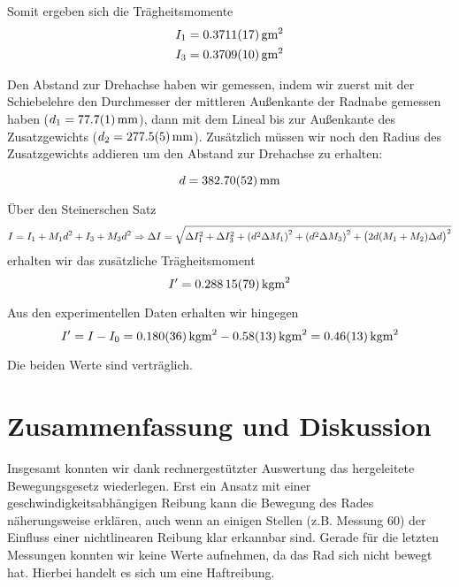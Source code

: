 \documentclass[a4paper,german,12pt,smallheadings]{scrartcl}
\begin{document}
Somit ergeben sich die Trägheitsmomente
\begin{align*}
  I_1 &= \SI{0.3711+-0.0017}{g m^2} \\
  I_3 &= \SI{0.3709+-0.0010}{g m^2}
\end{align*}

Den Abstand zur Drehachse haben wir gemessen, indem wir zuerst mit der
Schiebelehre den Durchmesser der mittleren Außenkante der Radnabe gemessen
haben ($d_1 = \SI{77.7+-0.1}{mm}$), dann mit dem Lineal bis zur Außenkante des
Zusatzgewichts ($d_2 = \SI{277.5+-0.5}{mm}$). Zusätzlich müssen wir noch den
Radius des Zusatzgewichts addieren um den Abstand zur Drehachse zu erhalten:

\begin{equation}
  d = \SI{382.70\pm0.52}{mm}
\end{equation}

Über den Steinerschen Satz
\begin{equation}
  I = I_1 + M_1 d^2 + I_3 + M_3 d^2 \Rightarrow
  \Delta I = \sqrt{\Delta I_1^2 + \Delta I_3^2 + \del{d^2 \Delta M_1}^2 +
  \del{d^2 \Delta M_3}^2 + \del{2d (M_1+M_2) \Delta d}^2}
\end{equation}
erhalten wir das zusätzliche Trägheitsmoment
\begin{equation}
  I' = \SI{0.28815+-0.00079}{kg m^2}
\end{equation}

Aus den experimentellen Daten erhalten wir hingegen
\begin{equation}
  I' = I - I_0 = \SI{0.180+-0.036}{kg m^2} - \SI{0.58+-0.13}{kg m^2} = \SI{0.46+-0.13}{kg m^2}
\end{equation}

Die beiden Werte sind verträglich.

\section{Zusammenfassung und Diskussion}
Insgesamt konnten wir dank rechnergestützter Auswertung das hergeleitete
Bewegungsgesetz wiederlegen. Erst ein Ansatz mit einer
geschwindigkeitsabhängigen Reibung kann die Bewegung des Rades näherungsweise
erklären, auch wenn an einigen Stellen (z.B. Messung 60) der Einfluss einer
nichtlinearen Reibung klar erkannbar sind. Gerade für die letzten Messungen
konnten wir keine Werte aufnehmen, da das Rad sich nicht bewegt hat. Hierbei
handelt es sich um eine Haftreibung.
\end{document}
